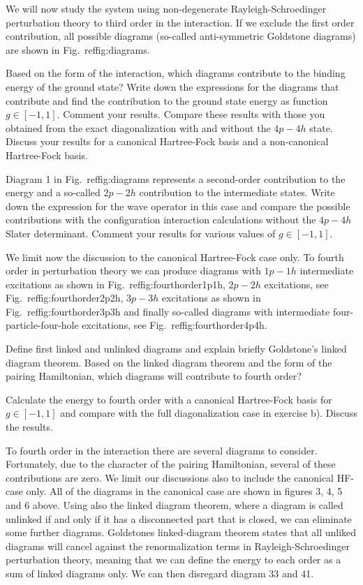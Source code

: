 \begin{prob}
We will now study the system using non-degenerate
Rayleigh-Schroedinger perturbation theory to third order in the
interaction.  If we exclude the first order contribution, all possible
diagrams (so-called anti-symmetric Goldstone diagrams) are
shown in Fig.~ref{fig:diagrams}.


Based on the form of the interaction, which diagrams contribute to the
binding energy of the ground state?  Write down the expressions for
the diagrams that contribute and find the contribution to the ground
state energy as function $g\in [-1,1]$. Comment your results.  Compare
these results with those you obtained from the exact diagonalization with and without the $4p-4h$ state.
Discuss your results for a canonical Hartree-Fock basis and a non-canonical Hartree-Fock basis.


Diagram 1 in Fig.~ref{fig:diagrams} represents a second-order contribution to the energy and a so-called $2p-2h$ contribution to the intermediate states. Write down the expression for the wave operator in this case and compare the possible contributions with the configuration interaction calculations without the $4p-4h$ Slater determinant. Comment your results for
various values of $g\in [-1,1]$.

We limit now the discussion to the canonical Hartree-Fock case only. To fourth order in perturbation theory we can produce diagrams with $1p-1h$ intermediate excitations as shown in Fig.~ref{fig:fourthorder1p1h}, $2p-2h$ excitations, see Fig.~ref{fig:fourthorder2p2h}, $3p-3h$ excitations as shown in Fig.~ref{fig:fourthorder3p3h} and finally so-called diagrams with intermediate four-particle-four-hole excitations, see Fig.~ref{fig:fourthorder4p4h}.

Define first linked and unlinked diagrams and explain briefly Goldstone's linked diagram theorem.
Based on the linked diagram theorem and the form of the pairing Hamiltonian, which diagrams will contribute
to fourth order?

Calculate the energy to fourth order with a canonical Hartree-Fock basis for $g\in [-1,1]$ and compare
with the full diagonalization case in exercise b). Discuss the results.

To fourth order in the interaction there are several diagrams to consider.
Fortunately, due to the character of the pairing Hamiltonian, several of these contributions are
zero. We limit our discussions also to include the
canonical HF-case only.
All of the diagrams in the canonical case are
shown in figures 3, 4, 5 and 6 above.
Using also the linked diagram theorem, where a
diagram is called unlinked if and only if it has a disconnected part
that is closed, we can eliminate some further  diagrams. Goldstones
linked-diagram theorem states that all unliked diagrams will cancel
against the renormalization terms in Rayleigh-Schroedinger perturbation theory,
meaning that we can define
the energy to each order as a sum of linked diagrams
only. We can then disregard diagram 33 and 41.


\end{prob}

